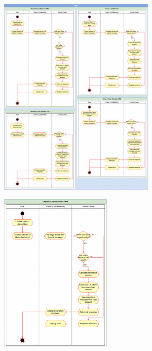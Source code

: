 \documentclass[a4paper]{article}
\begin{document}
\begin{figure}[!htbp]
\centering
\includegraphics[width=0.7\textwidth]{assets/lp1.png}
\caption{}
\end{figure}

\begin{figure}[!htbp]
\centering
\includegraphics[width=0.5\textwidth]{assets/lp2.png}
\caption{}
\end{figure}
\end{document}
